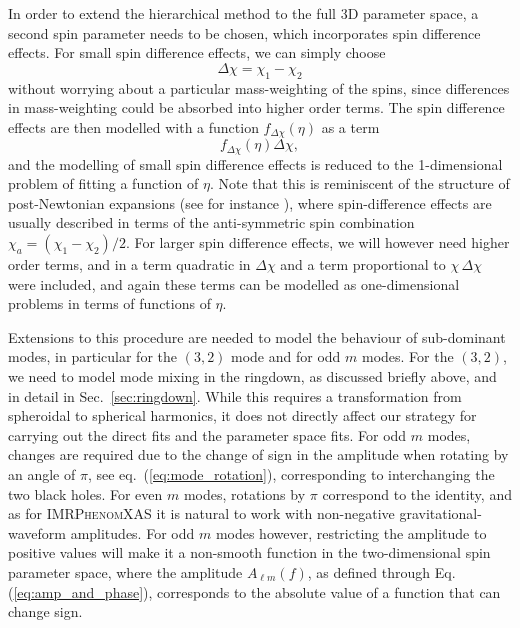 \documentclass[twocolumn,prd,aps,superscriptaddress,preprintnumbers,tightenlines,showpacs,nofootinbib,eqsecnum,amsfonts,amsmath]{revtex4}
\newcommand{\phX}{\textsc{IMRPhenomXAS}\xspace}
\begin{document}
In order to extend the hierarchical method to the full 3D parameter space, a second spin parameter needs to be chosen, which incorporates spin difference effects. For small spin difference effects, we can simply choose
 \begin{equation}
    \Delta \chi = \chi_1 - \chi_2
 \end{equation}
 without worrying about a particular mass-weighting of the spins, since differences in mass-weighting could be absorbed into higher order terms.
 The spin difference effects are then modelled with a function $f_{\Delta\chi}(\eta)$ as a term
  \begin{equation}
    f_{\Delta\chi}(\eta) \Delta \chi,
 \end{equation}
and the modelling of small spin difference effects is reduced to the 1-dimensional problem of fitting a function of $\eta$. Note that this is reminiscent of the structure of post-Newtonian expansions (see for instance \cite{PNamps}), where spin-difference effects are usually described in terms of the anti-symmetric spin combination $\chi_a=(\chi_1-\chi_2)/2$.
% 
For larger spin difference effects, we will however need higher order terms, and in \cite{Jimenez-Forteza:2016oae}
a term quadratic in $\Delta \chi$ and a term proportional to 
$\chi \, \Delta\chi$ were included, and again these terms can be modelled as one-dimensional problems in terms of functions of $\eta$.

Extensions to this procedure are needed to model the behaviour of sub-dominant modes, in particular for the $(3,2)$ mode and for odd $m$ modes. For the $(3,2)$, we need to model mode mixing in the ringdown, as discussed briefly above, and in detail in Sec.~\ref{sec:ringdown}. While this requires a transformation from spheroidal to spherical harmonics, it does not directly affect our strategy for carrying out the direct fits and the parameter space fits. For odd $m$ modes, changes are required due to the change of sign in the amplitude when rotating by an angle of $\pi$, see eq.~(\ref{eq:mode_rotation}), corresponding to interchanging the two black holes.
For even $m$ modes, rotations by $\pi$ correspond to the identity, and as for \phX it is natural to work with non-negative gravitational-waveform amplitudes. 
For odd $m$ modes however, restricting the amplitude to positive values will make it a non-smooth function in the two-dimensional spin parameter space, where the amplitude $A_{\ell m}(f)$, as defined through Eq.\,(\ref{eq:amp_and_phase}), corresponds to the absolute value of a function that can change sign. 
%
\end{document}
